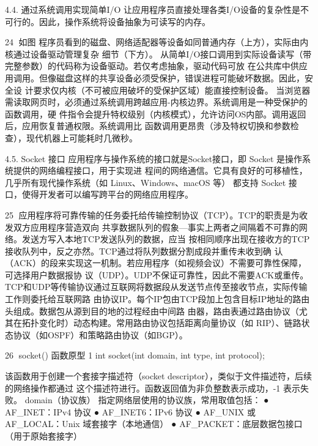 4.4.   通过系统调用实现简单I/O
让应用程序员直接处理各类I/O设备的复杂性是不可行的。因此，操作系统将设备抽象为可读写的内存。




                                                     24
如图 程序员看到的磁盘、网络适配器等设备如同普通内存（上方），实际由内核通过设备驱动管理复杂
细节（下方）。
从简单I/O接口调用到实际设备读写（带完整参数）的代码称为设备驱动。若仅考虑抽象，驱动代码可放
在公共库中供应用调用。但像磁盘这样的共享设备必须受保护，错误进程可能破坏数据。因此，安全设
计要求仅内核（不可被应用破坏的受保护区域）能直接控制设备。
当浏览器需读取网页时，必须通过系统调用跨越应用-内核边界。系统调用是一种受保护的函数调用，硬
件指令会提升特权级别（内核模式），允许访问OS内部。调用返回后，应用恢复普通权限。系统调用比
函数调用更昂贵（涉及特权切换和参数检查），现代机器上可能耗时几微秒。

4.5.   Socket 接口
应用程序与操作系统的接口就是Socket接口，即 Socket 是操作系统提供的网络编程接口，用于实现进
程间的网络通信。它具有良好的可移植性，几乎所有现代操作系统（如 Linux、Windows、macOS 等）
都支持 Socket 接口，使得开发者可以编写跨平台的网络应用程序。




                                                    25
应用程序将可靠传输的任务委托给传输控制协议（TCP）。TCP的职责是为收发双方应用程序营造双向
共享数据队列的假象—事实上两者之间隔着不可靠的网络。发送方写入本地TCP发送队列的数据，应当
按相同顺序出现在接收方的TCP接收队列中，反之亦然。TCP通过将队列数据分割成段并重传未收到确
认（ACK）的段来实现这一机制。若应用程序（如视频会议）不需要可靠性保障，可选择用户数据报协
议（UDP）。UDP不保证可靠性，因此不需要ACK或重传。
TCP和UDP等传输协议通过互联网将数据段从发送节点传至接收节点，实际传输工作则委托给互联网路
由协议IP。每个IP包由TCP段加上包含目标IP地址的路由头组成。数据包从源到目的地的过程经由中间路
由器，路由表通过路由协议（尤其在拓扑变化时）动态构建。常用路由协议包括距离向量协议（如
RIP）、链路状态协议（如OSPF）和策略路由协议（如BGP）。




                                                 26
socket() 函数原型
 1   int socket(int domain, int type, int protocol);


该函数用于创建一个套接字描述符（socket descriptor），类似于文件描述符，后续的网络操作都通过
这个描述符进行。函数返回值为非负整数表示成功，-1 表示失败。
domain（协议族）
指定网络层使用的协议族，常用取值包括：
  ● AF_INET﻿：IPv4 协议
  ● AF_INET6﻿：IPv6 协议
  ● AF_UNIX﻿ 或 ﻿AF_LOCAL﻿：Unix 域套接字（本地通信）
  ● AF_PACKET﻿：底层数据包接口（用于原始套接字）

